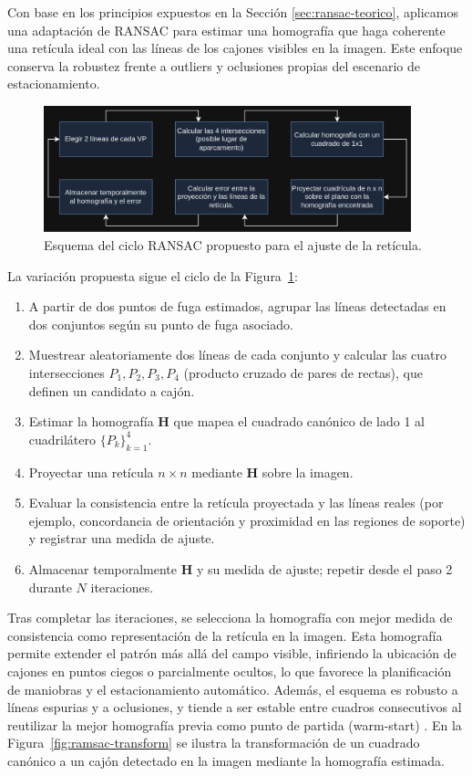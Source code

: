 \noindent
Con base en los principios expuestos en la Sección \ref{sec:ransac-teorico},
aplicamos una adaptación de RANSAC para estimar una homografía que haga coherente una retícula ideal con
las líneas de los cajones visibles en la imagen. Este enfoque conserva la robustez frente a outliers y
oclusiones propias del escenario de estacionamiento.

\begin{figure}[!ht]
    \centering
    \includegraphics[width=0.95\textwidth]{img/3-metodo/ramsac_loop.png}
    \caption{Esquema del ciclo RANSAC propuesto para el ajuste de la retícula.}
    \label{fig:ramsac-flujo}
\end{figure}

\noindent
La variación propuesta sigue el ciclo de la Figura~\ref{fig:ramsac-flujo}:
\begin{enumerate}
    \item A partir de dos puntos de fuga estimados, agrupar las líneas detectadas en dos conjuntos según su punto de fuga asociado.
    \item Muestrear aleatoriamente dos líneas de cada conjunto y calcular las cuatro intersecciones \(P_1, P_2, P_3, P_4\) (producto cruzado de pares de rectas), que definen un candidato a cajón.
    \item Estimar la homografía \(\mathbf{H}\) que mapea el cuadrado canónico de lado 1 al cuadrilátero \(\{P_k\}_{k=1}^4\).
    \item Proyectar una retícula \(n\times n\) mediante \(\mathbf{H}\) sobre la imagen.
    \item Evaluar la consistencia entre la retícula proyectada y las líneas reales (por ejemplo, concordancia de orientación y proximidad en las regiones de soporte) y registrar una medida de ajuste.
    \item Almacenar temporalmente \(\mathbf{H}\) y su medida de ajuste; repetir desde el paso 2 durante \(N\) iteraciones.
\end{enumerate}

\noindent
Tras completar las iteraciones, se selecciona la homografía con mejor medida de consistencia 
como representación de la retícula en la imagen. 
Esta homografía permite extender el patrón más allá del campo visible, 
infiriendo la ubicación de cajones en puntos ciegos o parcialmente ocultos, 
lo que favorece la planificación de maniobras y el estacionamiento automático. 
Además, el esquema es robusto a líneas espurias y a oclusiones, 
y tiende a ser estable entre cuadros consecutivos al reutilizar la mejor homografía previa como
punto de partida (warm-start) . En la Figura~\ref{fig:ramsac-transform} se ilustra 
la transformación de un cuadrado canónico a un cajón detectado en la imagen mediante la homografía estimada.


